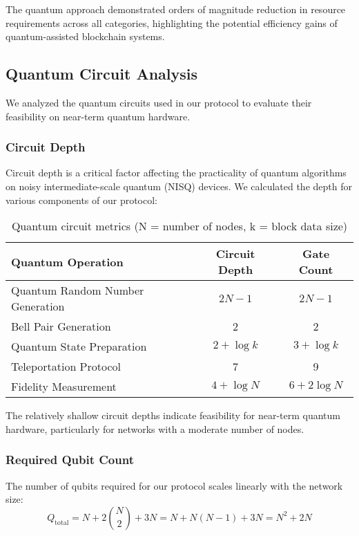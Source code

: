 \documentclass[11pt,a4paper]{article}
\begin{document}
The quantum approach demonstrated orders of magnitude reduction in resource requirements across all categories, highlighting the potential efficiency gains of quantum-assisted blockchain systems.

\subsection{Quantum Circuit Analysis}
We analyzed the quantum circuits used in our protocol to evaluate their feasibility on near-term quantum hardware.

\subsubsection{Circuit Depth}
Circuit depth is a critical factor affecting the practicality of quantum algorithms on noisy intermediate-scale quantum (NISQ) devices. We calculated the depth for various components of our protocol:

\begin{table}[H]
\centering
\begin{tabular}{lcc}
\toprule
\textbf{Quantum Operation} & \textbf{Circuit Depth} & \textbf{Gate Count} \\
\midrule
Quantum Random Number Generation & $2N-1$ & $2N-1$ \\
Bell Pair Generation & 2 & 2 \\
Quantum State Preparation & $2 + \log k$ & $3 + \log k$ \\
Teleportation Protocol & 7 & 9 \\
Fidelity Measurement & $4 + \log N$ & $6 + 2\log N$ \\
\bottomrule
\end{tabular}
\caption{Quantum circuit metrics (N = number of nodes, k = block data size)}
\label{tab:circuit_metrics}
\end{table}

The relatively shallow circuit depths indicate feasibility for near-term quantum hardware, particularly for networks with a moderate number of nodes.

\subsubsection{Required Qubit Count}
The number of qubits required for our protocol scales linearly with the network size:
\begin{equation}
Q_{\text{total}} = N + 2\binom{N}{2} + 3N = N + N(N-1) + 3N = N^2 + 2N
\end{equation}
\end{document}
